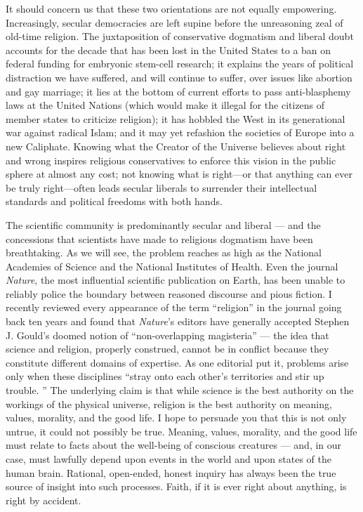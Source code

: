 \documentclass[a4paper,14pt]{extarticle}
\begin{document}
It should concern us that these two orientations are not equally empowering.
Increasingly, secular democracies are left supine before the unreasoning zeal of old-time religion.
The juxtaposition of conservative dogmatism and liberal doubt accounts for the decade that has been lost in the United States to a ban on federal funding for embryonic stem-cell research;
it explains the years of political distraction we have suffered, and will continue to suffer, over issues like abortion and gay marriage;
it lies at the bottom of current efforts to pass anti-blasphemy laws at the United Nations (which would make it illegal for the citizens of member states to criticize religion);
it has hobbled the West in its generational war against radical Islam;
and it may yet refashion the societies of Europe into a new Caliphate.
Knowing what the Creator of the Universe believes about right and wrong inspires religious conservatives to enforce this vision in the public sphere at almost any cost; not knowing what is right—or that anything can ever be truly right—often leads secular liberals to surrender their intellectual standards and political freedoms with both hands.

The scientific community is predominantly secular and liberal --- and the concessions that scientists have made to religious dogmatism have been breathtaking.
As we will see, the problem reaches as high as the National Academies of Science and the National Institutes of Health.
Even the journal \textit{Nature}, the most influential scientific publication on Earth, has been unable to reliably police the boundary between reasoned discourse and pious fiction.
I recently reviewed every appearance of the term ``religion'' in the journal going back ten years and found that \textit{Nature}'s editors have generally accepted Stephen J. Gould's doomed notion of ``non-overlapping magisteria'' --- the idea that science and religion, properly construed, cannot be in conflict because they constitute different domains of expertise.
As one editorial put it, problems arise only when these disciplines ``stray onto each other's territories and stir up trouble. ''
The underlying claim is that while science is the best authority on the workings of the physical universe, religion is the best authority on meaning, values, morality, and the good life.
I hope to persuade you that this is not only untrue, it could not possibly be true.
Meaning, values, morality, and the good life must relate to facts about the well-being of conscious creatures --- and, in our case, must lawfully depend upon events in the world and upon states of the human brain.
Rational, open-ended, honest inquiry has always been the true source of insight into such processes.
Faith, if it is ever right about anything, is right by accident.
\end{document}
